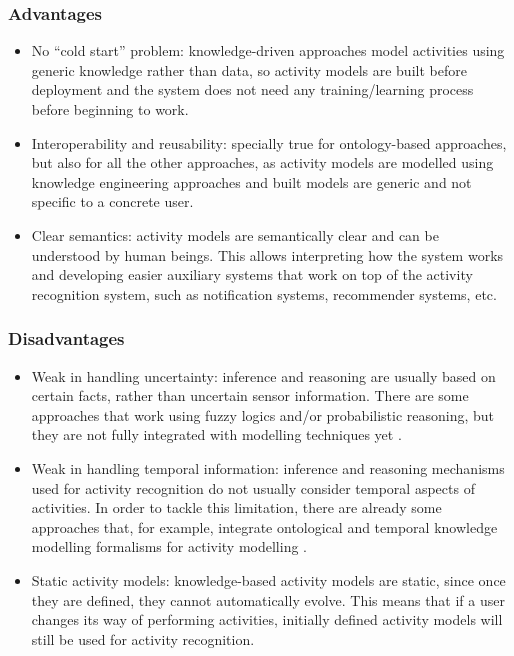 \subsubsection*{Advantages}
\begin{itemize}
 \item No ``cold start'' problem: knowledge-driven approaches model activities using generic knowledge rather than data, so activity models are built before deployment and the system does not need any training/learning process before beginning to work.
 \item Interoperability and reusability: specially true for ontology-based approaches, but also for all the other approaches, as activity models are modelled using knowledge engineering approaches and built models are generic and not specific to a concrete user. 
 \item Clear semantics: activity models are semantically clear and can be understood by human beings. This allows interpreting how the system works and developing easier auxiliary systems that work on top of the activity recognition system, such as notification systems, recommender systems, etc. 
\end{itemize}

\subsubsection*{Disadvantages}
\begin{itemize}
 \item Weak in handling uncertainty: inference and reasoning are usually based on certain facts, rather than uncertain sensor information. There are some approaches that work using fuzzy logics and/or probabilistic reasoning, but they are not fully integrated with modelling techniques yet \cite{Helaoui2013} \cite{Almeida2012}.
 \item Weak in handling temporal information: inference and reasoning mechanisms used for activity recognition do not usually consider temporal aspects of activities. In order to tackle this limitation, there are already some approaches that, for example, integrate ontological and temporal knowledge modelling formalisms for activity modelling \cite{Okeyo2012}. 
 \item Static activity models: knowledge-based activity models are static, since once they are defined, they cannot automatically evolve. This means that if a user changes its way of performing activities, initially defined activity models will still be used for activity recognition.
\end{itemize}


